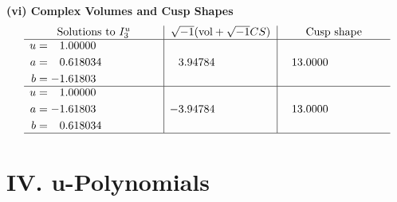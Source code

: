 \documentclass[1p]{elsarticle_modified}
\theoremstyle{definition}
\newcommand{\I}{\sqrt{-1}}
\begin{document}
\newpage\flushleft \textbf{(vi) Complex Volumes and Cusp Shapes}
$$\begin{array}{c|c|c}  
\text{Solutions to }I^u_{3}& \I (\text{vol} + \sqrt{-1}CS) & \text{Cusp shape}\\
 \hline 
\begin{aligned}
u &= \phantom{-}1.00000\phantom{ +0.000000I} \\
a &= \phantom{-}0.618034\phantom{ +0.000000I} \\
b &= -1.61803\phantom{ +0.000000I}\end{aligned}
 & \phantom{-}3.94784\phantom{ +0.000000I} & \phantom{-}13.0000\phantom{ +0.000000I} \\ \hline\begin{aligned}
u &= \phantom{-}1.00000\phantom{ +0.000000I} \\
a &= -1.61803\phantom{ +0.000000I} \\
b &= \phantom{-}0.618034\phantom{ +0.000000I}\end{aligned}
 & -3.94784\phantom{ +0.000000I} & \phantom{-}13.0000\phantom{ +0.000000I}\\
 \hline 
 \end{array}$$\newpage
\newpage\renewcommand{\arraystretch}{1}
\centering \section*{ IV. u-Polynomials}
\end{document}
